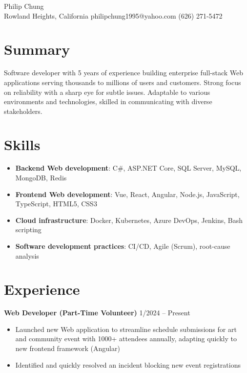 \documentclass[12pt]{article}
\newcommand{\primaryheader}[4]{
	\textbf{#1}
	\ifthenelse{\equal{#3}{}}{}{%
		\symbol{"B7} #3 \ifthenelse{\equal{#4}{}}{}{(#4)}
	}
	\hfill #2
}
\begin{document}
	\begin{center}
		{\headerfont\fontsize{24pt}{24pt}\selectfont Philip Chung} \\ \vspace{0.5em}
		Rowland Heights, California  philipchung1995@yahoo.com  (626) 271-5472
	\end{center}

	\section*{Summary}

	Software developer with 5 years of experience building enterprise full-stack Web applications serving thousands to millions of users and customers. Strong focus on reliability with a sharp eye for subtle issues. Adaptable to various environments and technologies, skilled in communicating with diverse stakeholders.

	\section*{Skills}

	\newcommand{\skillitem}[2]{\item \textbf{#1}: #2}

	\begin{itemize}[left=0.25in .. 0.25in,label={},itemindent=-0.25in]
		\skillitem{Backend Web development}{C\#, ASP.NET Core, SQL Server, MySQL, MongoDB, Redis}
		\skillitem{Frontend Web development}{Vue, React, Angular, Node.js, JavaScript, TypeScript, HTML5, CSS3}
		\skillitem{Cloud infrastructure}{Docker, Kubernetes, Azure DevOps, Jenkins, Bash scripting}
		\skillitem{Software development practices}{CI/CD, Agile (Scrum), root-cause analysis}
	\end{itemize}

	\section*{Experience}

	\primaryheader{Web Developer (Part-Time Volunteer)}{1/2024 -- Present}{PNW}{Remote}

	\begin{itemize}
		\item Launched new Web application to streamline schedule submissions for art and community event with 1000+ attendees annually, adapting quickly to new frontend framework (Angular)
		\item Identified and quickly resolved an incident blocking new event registrations
	\end{itemize}
\end{document}
